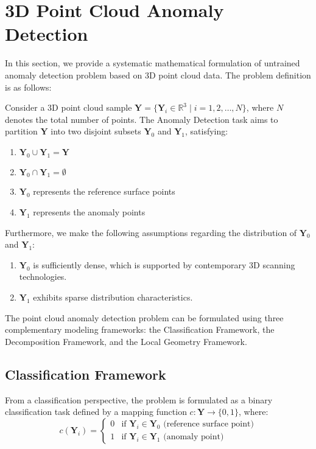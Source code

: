 \section{3D Point Cloud Anomaly Detection}
In this section, we provide a systematic mathematical formulation of untrained anomaly detection problem based on 3D point cloud data. The problem definition is as follows:

Consider a 3D point cloud sample \( \mathbf{Y} = \{ \mathbf{Y}_i \in \mathbb{R}^3 \mid i = 1, 2, \ldots, N \} \), where \( N \) denotes the total number of points. The Anomaly Detection task aims to partition \( \mathbf{Y} \) into two disjoint subsets \( \mathbf{Y}_0 \) and \( \mathbf{Y}_1 \), satisfying:
\begin{enumerate}[itemsep=1pt]
    \item \( \mathbf{Y}_0 \cup \mathbf{Y}_1 = \mathbf{Y} \)
    \item \( \mathbf{Y}_0 \cap \mathbf{Y}_1 = \emptyset \)
    \item \( \mathbf{Y}_0 \) represents the reference surface points
    \item \( \mathbf{Y}_1 \) represents the anomaly points
\end{enumerate}
Furthermore, we make the following assumptions regarding the distribution of \( \mathbf{Y}_0 \) and \( \mathbf{Y}_1 \):
\begin{enumerate}[itemsep=1pt]
    \item \( \mathbf{Y}_0 \) is sufficiently dense, which is supported by contemporary 3D scanning technologies.
    \item \( \mathbf{Y}_1 \) exhibits sparse distribution characteristics.
\end{enumerate}
The point cloud anomaly detection problem can be formulated using three complementary modeling frameworks: the Classification Framework, the Decomposition Framework, and the Local Geometry Framework.
\subsection{Classification Framework}
From a classification perspective, the problem is formulated as a binary classification task defined by a mapping function \( c: \mathbf{Y} \rightarrow \{0,1\} \), where:
\begin{equation}
    c(\mathbf{Y}_i) = \begin{cases}
        0 & \text{if } \mathbf{Y}_i \in \mathbf{Y}_0 \text{ (reference surface point)} \\
        1 & \text{if } \mathbf{Y}_i \in \mathbf{Y}_1 \text{ (anomaly point)}
    \end{cases}
\end{equation}

